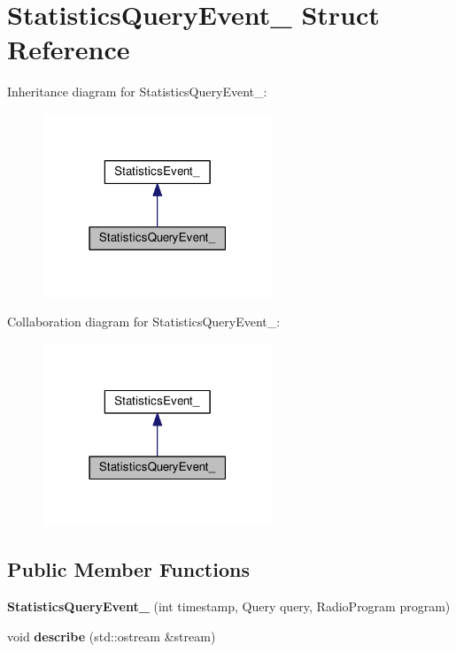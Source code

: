 \hypertarget{struct_statistics_query_event__}{}\section{Statistics\+Query\+Event\+\_\+ Struct Reference}
\label{struct_statistics_query_event__}


Inheritance diagram for Statistics\+Query\+Event\+\_\+\+:
\nopagebreak
\begin{figure}[H]
\begin{center}
\leavevmode
\includegraphics[width=195pt]{struct_statistics_query_event____inherit__graph}
\end{center}
\end{figure}


Collaboration diagram for Statistics\+Query\+Event\+\_\+\+:
\nopagebreak
\begin{figure}[H]
\begin{center}
\leavevmode
\includegraphics[width=195pt]{struct_statistics_query_event____coll__graph}
\end{center}
\end{figure}
\subsection*{Public Member Functions}
\begin{DoxyCompactItemize}
\item 
{\bfseries Statistics\+Query\+Event\+\_\+} (int timestamp, Query query, Radio\+Program program)\hypertarget{struct_statistics_query_event___acbf94d21664dcdaa682c3b91e14254cd}{}\label{struct_statistics_query_event___acbf94d21664dcdaa682c3b91e14254cd}

\item 
void {\bfseries describe} (std\+::ostream \&stream)\hypertarget{struct_statistics_query_event___a1301f4046157f43d337d80e195a10e42}{}\label{struct_statistics_query_event___a1301f4046157f43d337d80e195a10e42}

\end{DoxyCompactItemize}
